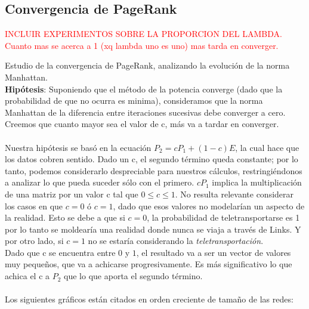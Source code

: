 \documentclass[a4paper]{article}
\begin{document}
\subsection{Convergencia de PageRank}

\textcolor{red}{INCLUIR EXPERIMENTOS SOBRE LA PROPORCION DEL LAMBDA. Cuanto mas se acerca a 1 (xq lambda uno es uno) mas tarda en converger.}

Estudio de la convergencia de PageRank, analizando la evolución de la norma Manhattan.\\
\textbf{Hip\'otesis}: Suponiendo que el método de la potencia converge (dado que la probabilidad de que no ocurra es minima), consideramos que la norma Manhattan de la diferencia entre iteraciones sucesivas debe converger a cero. Creemos que cuanto mayor sea el valor de c, más va a tardar en converger.\\
\\
\indent Nuestra hip\'otesis se bas\'o en la ecuaci\'on $P_2= cP_1+(1-c)E$, la cual hace que los datos cobren sentido. Dado un c, el segundo t\'ermino queda constante; por lo tanto, podemos considerarlo despreciable para nuestros cálculos, restringiéndonos a analizar lo que pueda suceder s\'olo con el primero. $cP_1$ implica la multiplicación de una matriz por un valor c tal que $0 \leq c \leq 1$. No resulta relevante considerar los casos en que $c= 0$ \'o $c=1$, dado que esos valores no modelarían un aspecto de la realidad. Esto se debe a que si $c=0$, la probabilidad de teletransportarse es 1 por lo tanto se moldear\'ia una realidad donde nunca se viaja a trav\'es de Links. Y por otro lado, si $c=1$ no se estar\'ia considerando la \emph{teletransportaci\'on}. \\
\indent Dado que c se encuentra entre $0$ y $1$, el resultado va a ser un vector de valores muy pequeños, que va a achicarse progresivamente. Es m\'as significativo lo que achica el c a $P_2$ que lo que aporta el segundo t\'ermino.   \\
\\
Los siguientes gr\'aficos est\'an citados en orden creciente de tama\~no de las redes:\\
\end{document}

